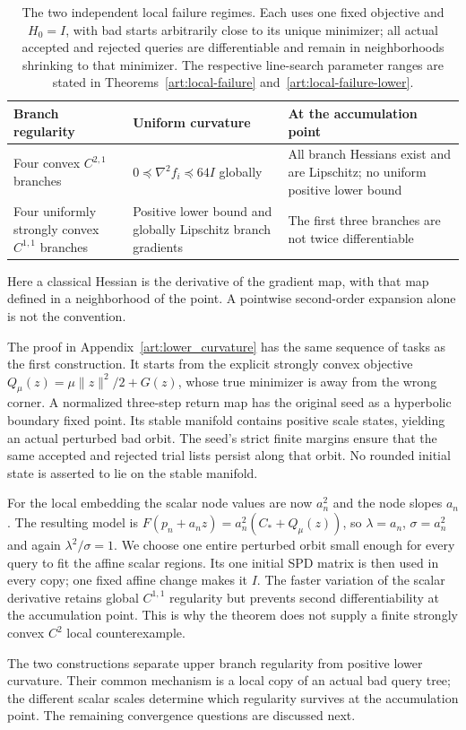 \begin{table}[t]
\centering
\begin{tabular}{p{}p{}p{}}
\hline
Branch regularity & Uniform curvature & At the accumulation point\\
\hline
Four convex $C^{2,1}$ branches
& $0\preceq\nabla^2f_i\preceq64I$ globally
& All branch Hessians exist and are Lipschitz; no uniform positive lower bound\\[3pt]
Four uniformly strongly convex $C^{1,1}$ branches
& Positive lower bound and globally Lipschitz branch gradients
& The first three branches are not twice differentiable\\
\hline
\end{tabular}
\caption{The two independent local failure regimes. Each uses one fixed
objective and $H_0=I$, with bad starts arbitrarily close to its unique
minimizer; all actual accepted and rejected queries are differentiable
and remain in neighborhoods shrinking to that minimizer. The respective
line-search parameter ranges are stated in
Theorems~\ref{art:local-failure} and~\ref{art:local-failure-lower}.}
\label{art:regularity-map}
\end{table}

Here a classical Hessian is the derivative of the gradient map, with that
map defined in a neighborhood of the point. A pointwise second-order
expansion alone is not the convention.

The proof in Appendix~\ref{art:lower_curvature} has the same sequence of
tasks as the first construction. It starts from the explicit strongly convex
objective $Q_\mu(z)=\mu\|z\|^2/2+G(z)$, whose true minimizer is away from
the wrong corner. A normalized three-step return map has the original seed
as a hyperbolic boundary fixed point. Its stable manifold contains positive
scale states, yielding an actual perturbed bad orbit. The seed's strict
finite margins ensure that the same accepted and rejected trial lists
persist along that orbit. No rounded initial state is asserted to lie on
the stable manifold.

For the local embedding the scalar node values are now $a_n^2$ and the
node slopes $a_n$. The resulting model is
$F(p_n+a_nz)=a_n^2(C_*+Q_\mu(z))$, so
$\lambda=a_n$, $\sigma=a_n^2$ and again
$\lambda^2/\sigma=1$. We choose one entire perturbed orbit small enough
for every query to fit the affine scalar regions. Its one initial SPD
matrix is then used in every copy; one fixed affine change makes it $I$.
The faster variation of the scalar derivative retains global $C^{1,1}$
regularity but prevents second differentiability at the accumulation point.
This is why the theorem does not supply a finite strongly convex $C^2$
local counterexample.

The two constructions separate upper branch regularity from positive lower
curvature. Their common mechanism is a local copy of an actual bad query
tree; the different scalar scales determine which regularity survives at
the accumulation point. The remaining convergence questions are discussed
next.
